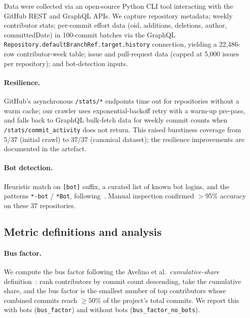 \documentclass[a4paper,UKenglish,cleveref,autoref,thm-restate]{lipics-v2021}
\begin{document}
Data were collected via an open-source Python CLI tool interacting with the GitHub REST and GraphQL APIs. We capture repository metadata; weekly contributor stats; per-commit effort data (oid, additions, deletions, author, committedDate) in 100-commit batches via the GraphQL \texttt{Repository.defaultBranchRef.target.history} connection, yielding a 22{,}486-row contributor-week table; issue and pull-request data (capped at 5{,}000 issues per repository); and bot-detection inputs.

\paragraph{Resilience.}
GitHub's asynchronous \texttt{/stats/*} endpoints time out for repositories without a warm cache; our crawler uses exponential-backoff retry with a warm-up pre-pass, and falls back to GraphQL bulk-fetch data for weekly commit counts when \texttt{/stats/commit\_activity} does not return. This raised burstiness coverage from 5/37 (initial crawl) to 37/37 (canonical dataset); the resilience improvements are documented in the artefact.

\paragraph{Bot detection.}
Heuristic match on \texttt{[bot]} suffix, a curated list of known bot logins, and the patterns \texttt{*-bot} / \texttt{*Bot}, following~\cite{Dey2020,Golzadeh2021}. Manual inspection confirmed $>$95\% accuracy on these 37 repositories.

\subsection{Metric definitions and analysis}\label{sec:analysis}

\paragraph{Bus factor.}
We compute the bus factor following the Avelino et al.\ \emph{cumulative-share} definition~\cite{Avelino2016}: rank contributors by commit count descending, take the cumulative share, and the bus factor is the smallest number of top contributors whose combined commits reach $\geq 50\%$ of the project's total commits. We report this with bots (\texttt{bus\_factor}) and without bots (\texttt{bus\_factor\_no\_bots}).
\end{document}
